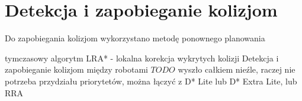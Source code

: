 \section{Detekcja i zapobieganie kolizjom}
\label{ch:alg-collision-avoid}


Do zapobiegania kolizjom wykorzystano metodę ponownego planowania 

tymczasowy algorytm
LRA* - lokalna korekcja wykrytych kolizji
Detekcja i zapobieganie kolizjom między robotami
$TODO$ wyszło całkiem nieźle, raczej nie potrzeba przydziału priorytetów, można łączyć z D* Lite lub D* Extra Lite, lub RRA